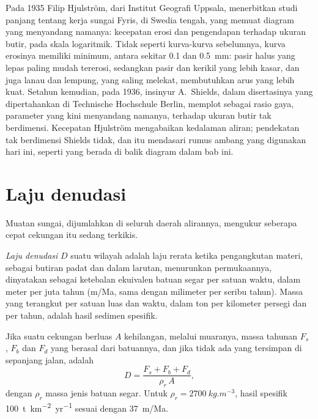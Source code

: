 \begin{history}
Pada 1935 Filip Hjulström, dari Institut Geografi Uppsala, menerbitkan studi panjang tentang kerja sungai Fyris, di Swedia tengah, yang memuat diagram yang menyandang namanya: kecepatan erosi dan pengendapan terhadap ukuran butir, pada skala logaritmik. Tidak seperti kurva-kurva sebelumnya, kurva erosinya memiliki minimum, antara sekitar \num{0.1} dan \qty{0.5}{mm}: pasir halus yang lepas paling mudah tererosi, sedangkan pasir dan kerikil yang lebih kasar, dan juga lanau dan lempung, yang saling melekat, membutuhkan arus yang lebih kuat. Setahun kemudian, pada 1936, insinyur A.~Shields, dalam disertasinya yang dipertahankan di Technische Hochschule Berlin, memplot  sebagai rasio gaya, parameter yang kini menyandang namanya, terhadap ukuran butir tak berdimensi. Kecepatan Hjulström mengabaikan kedalaman aliran; pendekatan tak berdimensi Shields tidak, dan itu mendasari rumus ambang yang digunakan hari ini, seperti yang berada di balik diagram dalam bab ini.
\end{history}

\section{Laju denudasi}\label{sec:b1:erosion-transport:denudation}

Muatan sungai, dijumlahkan di seluruh daerah alirannya, mengukur seberapa cepat cekungan itu sedang terkikis.

\begin{definition}\label{def:b1:erosion-transport:denudation}
\emph{Laju denudasi} $D$ suatu wilayah adalah laju rerata ketika pengangkutan materi, sebagai butiran padat dan dalam larutan, menurunkan permukaannya, dinyatakan sebagai ketebalan ekuivalen batuan segar per satuan waktu, dalam meter per juta tahun (\unit{m/Ma}, sama dengan milimeter per seribu tahun). Massa yang terangkut per satuan luas dan waktu, dalam ton per kilometer persegi dan per tahun, adalah hasil sedimen spesifik.
\end{definition}

\begin{proposition}\label{prop:b1:erosion-transport:denudation}
Jika suatu cekungan berluas $A$ kehilangan, melalui muaranya, massa tahunan $F_s$ , $F_b$  dan $F_d$  yang berasal dari batuannya, dan jika tidak ada yang tersimpan di sepanjang jalan,  adalah
\[
  D = \frac{F_s + F_b + F_d}{\rho_r\,A},
\]
dengan $\rho_r$ massa jenis batuan segar. Untuk $\rho_r =
\qty{2700}{kg.m^{-3}}$, hasil spesifik \qty{100}{t.km^{-2}.yr^{-1}} sesuai dengan \qty{37}{m/Ma}.
\end{proposition}

